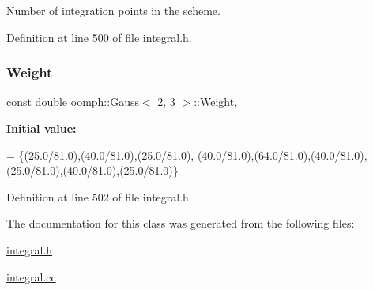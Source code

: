 Number of integration points in the scheme. 



Definition at line 500 of file integral.\+h.

\mbox{\label{classoomph_1_1Gauss_3_012_00_013_01_4_a9f6a4915292200bd62d4a84b3aec82b1}} 
\subsubsection{\texorpdfstring{Weight}{Weight}}
{\footnotesize\ttfamily const double \hyperlink{classoomph_1_1Gauss}{oomph\+::\+Gauss}$<$ 2, 3 $>$\+::Weight\hspace{0.3cm}{\ttfamily [static]}, {\ttfamily [private]}}

{\bfseries Initial value\+:}
\begin{DoxyCode}
= \{(25.0/81.0),(40.0/81.0),(25.0/81.0),
  (40.0/81.0),(64.0/81.0),(40.0/81.0),(25.0/81.0),(40.0/81.0),(25.0/81.0)\}
\end{DoxyCode}


Definition at line 502 of file integral.\+h.



The documentation for this class was generated from the following files\+:\begin{DoxyCompactItemize}
\item 
\hyperlink{integral_8h}{integral.\+h}\item 
\hyperlink{integral_8cc}{integral.\+cc}\end{DoxyCompactItemize}
